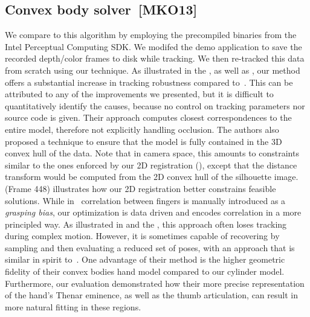 



\subsection*{Convex body solver~[MKO13]}

We compare to this algorithm by employing the precompiled binaries from the Intel Perceptual Computing SDK. We modifed the demo application to save the recorded depth/color frames to disk while tracking. We then re-tracked this data from scratch using our technique. As illustrated in the \VideoHtrackMelax, as well as , our method offers a substantial increase in tracking  robustness compared to~\cite{melax2013dynamics}. 
% 
This can be attributed to any of the improvements we presented, but it is difficult to quantitatively identify the causes, because no control on tracking parameters nor source code is given. 
% 
Their approach computes closest correspondences to the entire model, therefore not explicitly handling occlusion. 
%
The authors also proposed a technique to ensure that the model is fully contained in the 3D convex hull of the data. Note that in camera space, this amounts to constraints similar to the ones enforced by our 2D registration (), except that the distance transform would be computed from the 2D convex hull of the silhouette image.  (Frame 448) illustrates how our 2D registration better constrains feasible solutions. 
% 
While in~\cite{melax2013dynamics} correlation between fingers is manually introduced as a \emph{grasping bias}, our optimization is data driven and encodes correlation in a more principled way. As illustrated in  and the \VideoHtrackMelax, this approach often loses tracking during complex motion. However, it is sometimes capable of recovering by sampling and then evaluating a reduced set of poses, with an approach that is similar in spirit to~\cite{oiko2011hand}.
% 
One advantage of their method is the higher geometric fidelity of their convex bodies hand model compared to our cylinder model. Furthermore, our evaluation demonstrated how their more precise representation of the hand's Thenar eminence, as well as the thumb articulation, can result in more natural fitting in these regions.


